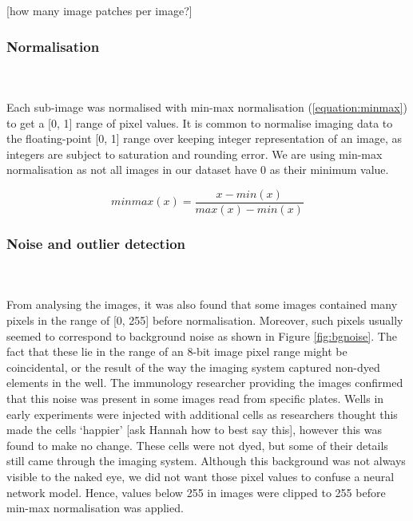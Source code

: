 [how many image patches per image?]
\bigskip
\subsubsection{Normalisation}

\hfill\\
\hfill\\
Each sub-image was normalised with min-max normalisation (\autoref{equation:minmax}) to get a [0, 1] range of pixel values. It is common to normalise imaging data to the floating-point [0, 1] range over keeping integer representation of an image, as integers are subject to saturation and rounding error. We are using min-max normalisation as not all images in our dataset have 0 as their minimum value.

\begin{equation}
    minmax(x) = \frac{x - min(x)}{max(x) - min(x)}
\label{equation:minmax}
\end{equation}

\bigskip
\subsubsection{Noise and outlier detection}

\hfill\\
\hfill\\
From analysing the images, it was also found that some images contained many pixels in the range of [0, 255] before normalisation. Moreover, such pixels usually seemed to correspond to background noise as shown in Figure \ref{fig:bgnoise}. The fact that these lie in the range of an 8-bit image pixel range might be coincidental, or the result of the way the imaging system captured non-dyed elements in the well. The immunology researcher providing the images confirmed that this noise was present in some images read from specific plates. Wells in early experiments were injected with additional cells as researchers thought this made the cells `happier' [ask Hannah how to best say this], however this was found to make no change. These cells were not dyed, but some of their details still came through the imaging system. Although this background was not always visible to the naked eye, we did not want those pixel values to confuse a neural network model. Hence, values below 255 in images were clipped to 255 before min-max normalisation was applied.

